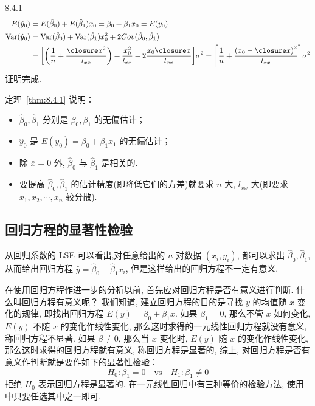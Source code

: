 \begin{theorem}{}{8.4.1}
\begin{equation*}
  \begin{split}
  E(\hat{y}_{0}) &= E(\hat{\beta}_{0}) + E(\hat{\beta}_{1}) x_{0} = \beta_{0} + \beta_{1} x_{0} = E(y_{0}) \\
  \Var(\hat{y}_{0}) &= \Var(\hat{\beta}_{0}) + \Var(\hat{\beta}_{1}) x_{0}^{2} + 2 Cov(\hat{\beta}_{0}, \hat{\beta}_{1}) \\
  & = \left[\left(\frac{1}{n}+\frac{\bar{x}^{2}}{l_{x x}}\right)+\frac{x_{0}^{2}}{l_{x x}}-2 \frac{x_{0} \bar{x}}{l_{x x}}\right]\sigma^{2}=\left[\frac{1}{n}+\frac{\left(x_{0}-\bar{x}\right)^{2}}{l_{x x}}\right]\sigma^{2}
  \end{split}
\end{equation*}
证明完成.
\end{theorem}

定理~\ref{thm:8.4.1} 说明：
\begin{itemize}
  \item  $\hat{\beta}_0, \hat{\beta}_1$ 分别是  $\beta_0, \beta_1$ 的无偏估计；
  \item  $\hat{y}_0$ 是 $E(y_0) =\beta_0 + \beta_1 x_1$ 的无偏估计；
  \item 除 $\bar{x}=0$ 外, $\hat{\beta}_0$ 与 $\hat{\beta}_1$ 是相关的.
  \item 要提高 $\hat{\beta}_0, \hat{\beta}_1$ 的估计精度(即降低它们的方差)就要求 $n$ 大, $l_{xx}$ 大(即要求 $x_1, x_2, \cdots, x_n$ 较分散).
\end{itemize}
\subsection{回归方程的显著性检验}\label{ssec:8.4.4}

从回归系数的 LSE 可以看出,对任意给出的 $n$ 对数据 $(x_i, y_i)$, 都可以求出 $\hat{\beta}_0, \hat{\beta}_1$, 从而给出回归方程 $\hat{y} = \hat{\beta }_0 + \hat{\beta }_1 x_{i}$, 但是这样给出的回归方程不一定有意义.

在使用回归方程作进一步的分析以前, 首先应对回归方程是否有意义进行判断. 什么叫回归方程有意义呢？ 我们知道, 建立回归方程的目的是寻找 $y $ 的均值随 $x$ 变化的规律, 即找出回归方程 $E(y) = \beta _0 + \beta _1 x$. 如果 $\beta_1 = 0$, 那么不管 $x$ 如何变化, $E(y)$ 不随 $x$  的变化作线性变化, 那么这时求得的一元线性回归方程就没有意义, 称回归方程不显著. 如果 $\beta \neq 0$, 那么当 $x$ 变化时, $E(y)$ 随 $x$ 的变化作线性变化, 那么这时求得的回归方程就有意义, 称回归方程是显著的, 综上, 对回归方程是否有意义作判断就是要作如下的显著性检验：
\begin{equation*}
H_0:\beta_1=0 \quad \text{vs} \quad H_1:\beta_1 \neq 0
\end{equation*}
拒绝 $H_0$ 表示回归方程是显著的. 在一元线性回归中有三种等价的检验方法, 使用中只要任选其中之一即可.

